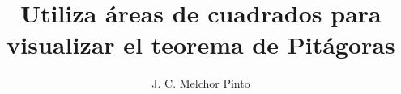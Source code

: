 \documentclass[12pt]{guia}
\title{Utiliza áreas de cuadrados para visualizar el teorema de Pitágoras}
\author{J. C. Melchor Pinto}
\begin{document}
\pagestyle{headandfoot}
\addpoints
\INFO
\printanswers
\vspace{-0.5cm}
\begin{multicols}{2}
    
    
    \columnbreak
    
\end{multicols}
\begin{questions}
    \questionboxed[10]{}
    \questionboxed[10]{}
    \questionboxed[10]{}
    \questionboxed[10]{}
    \questionboxed[10]{}
    \questionboxed[10]{}
    \questionboxed[10]{}
    \questionboxed[10]{}
    \questionboxed[10]{}
\end{questions}
\end{document}
